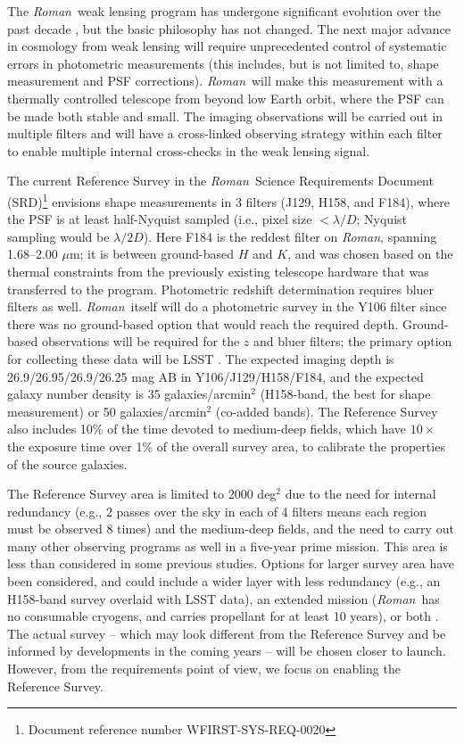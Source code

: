 \documentclass[usenatbib]{mnras}
\newcommand{\wfirst}{{\slshape Roman}}
\begin{document}
The \wfirst\ weak lensing program has undergone significant evolution over the past decade \citep{2011arXiv1108.1374G, 2012arXiv1208.4012G, 2013arXiv1305.5422S, 2015arXiv150303757S, 2018arXiv180403628D, 2019arXiv190205569A}, but the basic philosophy has not changed. The next major advance in cosmology from weak lensing will require unprecedented control of systematic errors in photometric measurements (this includes, but is not limited to, shape measurement and PSF corrections). \wfirst\ will make this measurement with a thermally controlled telescope from beyond low Earth orbit, where the PSF can be made both stable and small. The imaging observations will be carried out in multiple filters and will have a cross-linked observing strategy within each filter to enable multiple internal cross-checks in the weak lensing signal.

The current Reference Survey in the \wfirst\ Science Requirements Document (SRD)\footnote{Document reference number WFIRST-SYS-REQ-0020} envisions shape measurements in 3 filters (J129, H158, and F184), where the PSF is at least half-Nyquist sampled (i.e., pixel size $<\lambda/D$; Nyquist sampling would be $\lambda/2D$). Here F184 is the reddest filter on \wfirst, spanning 1.68--2.00 $\mu$m; it is between ground-based $H$ and $K$, and was chosen based on the thermal constraints from the previously existing telescope hardware that was transferred to the program. Photometric redshift determination requires bluer filters as well. \wfirst\ itself will do a photometric survey in the Y106 filter since there was no ground-based option that would reach the required depth. Ground-based observations will be required for the $z$ and bluer filters; the primary option for collecting these data will be LSST \citep{2009arXiv0912.0201L,2019ApJ...873..111I}.  The expected imaging depth is 26.9/26.95/26.9/26.25 mag AB in Y106/J129/H158/F184, and the expected galaxy number density is 35 galaxies/arcmin$^2$ (H158-band, the best for shape measurement) or 50 galaxies/arcmin$^2$ (co-added bands). The Reference Survey also includes 10\% of the time devoted to medium-deep fields, which have $10\times$ the exposure time over 1\% of the overall survey area, to calibrate the properties of the source galaxies. 

The Reference Survey area is limited to 2000 deg$^2$ due to the need for internal redundancy (e.g., 2 passes over the sky in each of 4 filters means each region must be observed 8 times) and the medium-deep fields, and the need to carry out many other observing programs as well in a five-year prime mission. This area is less than considered in some previous studies. Options for larger survey area have been considered, and could include a wider layer with less redundancy (e.g., an H158-band survey overlaid with LSST data), an extended mission (\wfirst\ has no consumable cryogens, and carries propellant for at least 10 years), or both \citep{2019BAAS...51c.418E}. The actual survey -- which may look different from the Reference Survey and be informed by developments in the coming years -- will be chosen closer to launch. However, from the requirements point of view, we focus on enabling the Reference Survey.
\end{document}
